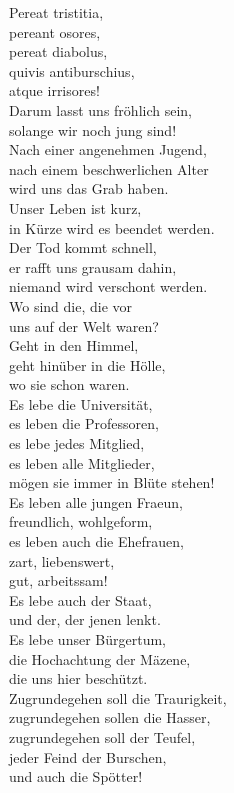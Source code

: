 \documentclass[a4paper]{article}
\begin{document}
\begin{multicols}{2}
	Pereat tristitia, \\
	pereant osores, \\
	pereat diabolus, \\
	quivis antiburschius, \\
	atque irrisores! \\

	
	Darum lasst uns fröhlich sein, \\
	solange wir noch jung sind! \\
	Nach einer angenehmen Jugend,  \\
	nach einem beschwerlichen Alter \\
	wird uns das Grab haben. \\
	
	Unser Leben ist kurz, \\
	in Kürze wird es beendet werden. \\
	Der Tod kommt schnell, \\
	er rafft uns grausam dahin, \\
	niemand wird verschont werden. \\
	
	Wo sind die, die vor \\
	uns auf der Welt waren? \\
	Geht in den Himmel, \\
	geht hinüber in die Hölle, \\
	wo sie schon waren. \\
	
	Es lebe die Universität, \\
	es leben die Professoren, \\
	es lebe jedes Mitglied, \\
	es leben alle Mitglieder, \\
	mögen sie immer in Blüte stehen!\\
	
	Es leben alle jungen Fraeun, \\
	freundlich, wohlgeform, \\
	es leben auch die Ehefrauen, \\
	zart, liebenswert, \\
	gut, arbeitssam! \\
	
	Es lebe auch der Staat, \\
	und der, der jenen lenkt. \\
	Es lebe unser Bürgertum, \\
	die Hochachtung der Mäzene, \\
	die uns hier beschützt. \\
	
	Zugrundegehen soll die Traurigkeit, \\
	zugrundegehen sollen die Hasser, \\
	zugrundegehen soll der Teufel, \\
	jeder Feind der Burschen, \\
	und auch die Spötter!
\end{multicols}
\end{document}
